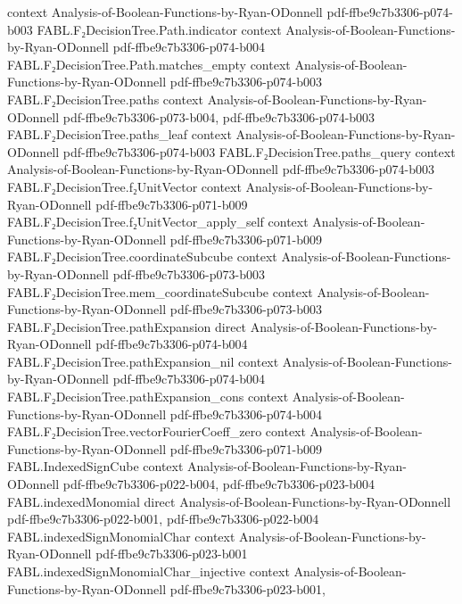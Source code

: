 \begin{theorem}
  {context}
  {Analysis-of-Boolean-Functions-by-Ryan-ODonnell}
  {pdf-ffbe9c7b3306-p074-b003}
\proofstep
  {FABL.F₂DecisionTree.Path.indicator}
  {context}
  {Analysis-of-Boolean-Functions-by-Ryan-ODonnell}
  {pdf-ffbe9c7b3306-p074-b004}
\proofstep
  {FABL.F₂DecisionTree.Path.matches_empty}
  {context}
  {Analysis-of-Boolean-Functions-by-Ryan-ODonnell}
  {pdf-ffbe9c7b3306-p074-b003}
\proofstep
  {FABL.F₂DecisionTree.paths}
  {context}
  {Analysis-of-Boolean-Functions-by-Ryan-ODonnell}
  {pdf-ffbe9c7b3306-p073-b004,
    pdf-ffbe9c7b3306-p074-b003}
\proofstep
  {FABL.F₂DecisionTree.paths_leaf}
  {context}
  {Analysis-of-Boolean-Functions-by-Ryan-ODonnell}
  {pdf-ffbe9c7b3306-p074-b003}
\proofstep
  {FABL.F₂DecisionTree.paths_query}
  {context}
  {Analysis-of-Boolean-Functions-by-Ryan-ODonnell}
  {pdf-ffbe9c7b3306-p074-b003}
\proofstep
  {FABL.F₂DecisionTree.f₂UnitVector}
  {context}
  {Analysis-of-Boolean-Functions-by-Ryan-ODonnell}
  {pdf-ffbe9c7b3306-p071-b009}
\proofstep
  {FABL.F₂DecisionTree.f₂UnitVector_apply_self}
  {context}
  {Analysis-of-Boolean-Functions-by-Ryan-ODonnell}
  {pdf-ffbe9c7b3306-p071-b009}
\proofstep
  {FABL.F₂DecisionTree.coordinateSubcube}
  {context}
  {Analysis-of-Boolean-Functions-by-Ryan-ODonnell}
  {pdf-ffbe9c7b3306-p073-b003}
\proofstep
  {FABL.F₂DecisionTree.mem_coordinateSubcube}
  {context}
  {Analysis-of-Boolean-Functions-by-Ryan-ODonnell}
  {pdf-ffbe9c7b3306-p073-b003}
\proofstep
  {FABL.F₂DecisionTree.pathExpansion}
  {direct}
  {Analysis-of-Boolean-Functions-by-Ryan-ODonnell}
  {pdf-ffbe9c7b3306-p074-b004}
\proofstep
  {FABL.F₂DecisionTree.pathExpansion_nil}
  {context}
  {Analysis-of-Boolean-Functions-by-Ryan-ODonnell}
  {pdf-ffbe9c7b3306-p074-b004}
\proofstep
  {FABL.F₂DecisionTree.pathExpansion_cons}
  {context}
  {Analysis-of-Boolean-Functions-by-Ryan-ODonnell}
  {pdf-ffbe9c7b3306-p074-b004}
\proofstep
  {FABL.F₂DecisionTree.vectorFourierCoeff_zero}
  {context}
  {Analysis-of-Boolean-Functions-by-Ryan-ODonnell}
  {pdf-ffbe9c7b3306-p071-b009}
\proofstep
  {FABL.IndexedSignCube}
  {context}
  {Analysis-of-Boolean-Functions-by-Ryan-ODonnell}
  {pdf-ffbe9c7b3306-p022-b004,
    pdf-ffbe9c7b3306-p023-b004}
\proofstep
  {FABL.indexedMonomial}
  {direct}
  {Analysis-of-Boolean-Functions-by-Ryan-ODonnell}
  {pdf-ffbe9c7b3306-p022-b001,
    pdf-ffbe9c7b3306-p022-b004}
\proofstep
  {FABL.indexedSignMonomialChar}
  {context}
  {Analysis-of-Boolean-Functions-by-Ryan-ODonnell}
  {pdf-ffbe9c7b3306-p023-b001}
\proofstep
  {FABL.indexedSignMonomialChar_injective}
  {context}
  {Analysis-of-Boolean-Functions-by-Ryan-ODonnell}
  {pdf-ffbe9c7b3306-p023-b001,
}
\end{theorem}
